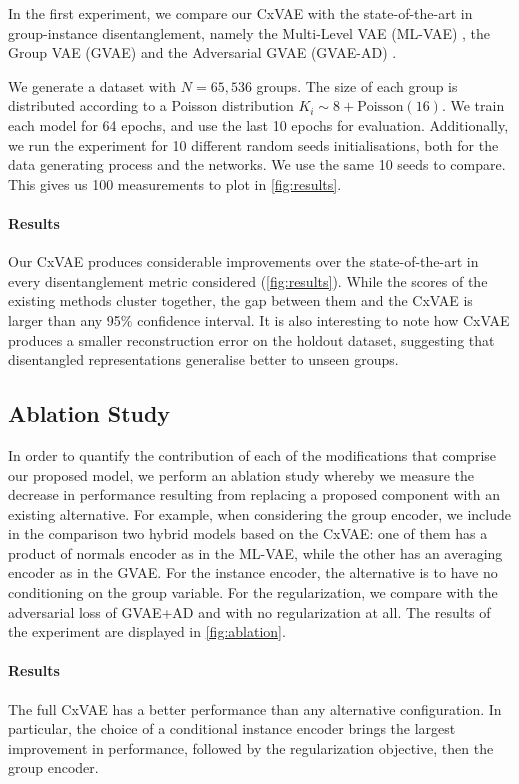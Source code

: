 \documentclass[nohyperref]{article}
\theoremstyle{plain}
\theoremstyle{definition}
\theoremstyle{remark}
\begin{document}
In the first experiment, we compare our CxVAE with the state-of-the-art in group-instance disentanglement, namely the Multi-Level VAE (ML-VAE) \citep{Bouchacourt2018MultiLevelVA}, the Group VAE (GVAE) \citep{Hosoya2019GroupbasedLO} and the Adversarial GVAE (GVAE-AD) \citep{Nmeth2020AdversarialDW}.

We generate a dataset with $N = 65,536$ groups. The size of each group is distributed according to a Poisson distribution $K_i \sim 8 + \mathrm{Poisson}(16)$. We train each model for 64 epochs, and use the last 10 epochs for evaluation. Additionally, we run the experiment for 10 different random seeds initialisations, both for the data generating process and the networks. We use the same 10 seeds to compare. This gives us 100 measurements to plot in \cref{fig:results}.

\paragraph{Results} Our CxVAE produces considerable improvements over the state-of-the-art in every disentanglement metric considered (\cref{fig:results}). While the scores of the existing methods cluster together, the gap between them and the CxVAE is larger than any 95\% confidence interval. It is also interesting to note how CxVAE produces a smaller reconstruction error on the holdout dataset, suggesting that disentangled representations generalise better to unseen groups.

\subsection{Ablation Study}

In order to quantify the contribution of each of the modifications that comprise our proposed model, we perform an ablation study whereby we measure the decrease in performance resulting from replacing a proposed component with an existing alternative. For example, when considering the group encoder, we include in the comparison two hybrid models based on the CxVAE: one of them has a product of normals encoder as in the ML-VAE, while the other has an averaging encoder as in the GVAE.  For the instance encoder, the alternative is to have no conditioning on the group variable. For the regularization, we compare with the adversarial loss of GVAE+AD and with no regularization at all. The results of the experiment are displayed in \cref{fig:ablation}.

\paragraph{Results} The full CxVAE has a better performance than any alternative configuration.  In particular, the choice of a conditional instance encoder brings the largest improvement in performance, followed by the regularization objective, then the group encoder.
\end{document}
